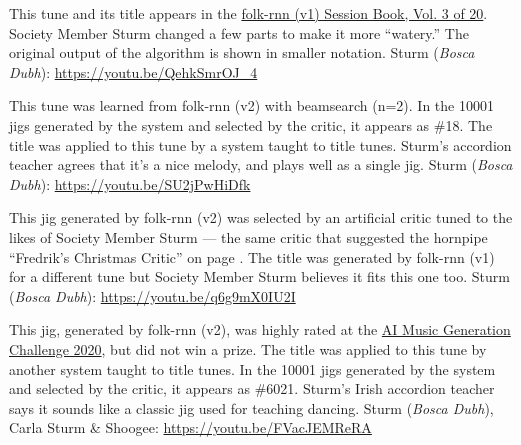 \documentclass[a4paper,notitlepage,twoside]{book}
\begin{document}
{}  
  
\hypertarget{jig:WatersofHeanny}{}
This tune and its title appears in the \href{https://highnoongmt.wordpress.com/2018/01/05/volumes-1-20-of-folk-rnn-v1-transcriptions}{folk-rnn (v1) Session Book, Vol. 3 of 20}.
Society Member Sturm changed a few parts to make it more ``watery.''
The original output of the algorithm is shown in smaller notation.
Sturm ({\em Bosca Dubh}): \url{https://youtu.be/QehkSmrOJ_4}

{}  
  
\hypertarget{jig:MyOve}{}
This tune was learned from folk-rnn (v2) with beamsearch (n=2).
In the 10001 jigs generated by the system and selected by the critic,
it appears as \#18. 
The title was applied to this tune by a system taught to title tunes.
Sturm's accordion teacher agrees that it's a nice melody,
and plays well as a single jig.
Sturm ({\em Bosca Dubh}): \url{https://youtu.be/SU2jPwHiDfk}

{}  
 
\hypertarget{jig:TeelinBrood}{}
This jig generated by folk-rnn (v2) was selected by an artificial critic 
tuned to the likes of Society Member Sturm --- the same critic that suggested
the hornpipe ``Fredrik's Christmas Critic'' on page \pageref{hornpipe:FredriksChristmasCritic}.
The title was generated by folk-rnn (v1) for a different tune
but Society Member Sturm believes it fits this one too.
Sturm ({\em Bosca Dubh}): \url{https://youtu.be/q6g9mX0IU2I}

{}  
  
\hypertarget{jig:Happytojeer}{}
This jig, generated by folk-rnn (v2),
was highly rated at the \href{https://highnoongmt.wordpress.com/2020/11/20/the-ai-music-generation-challenge-2020-summary-and-results/}{AI Music Generation Challenge 2020},
but did not win a prize. 
The title was applied to this tune by another system taught to title tunes.
In the 10001 jigs generated by the system and selected by the critic,
it appears as \#6021.
Sturm's Irish accordion teacher says it sounds like a classic jig 
used for teaching dancing.
Sturm ({\em Bosca Dubh}), Carla Sturm \& Shoogee: \url{https://youtu.be/FVacJEMReRA}
\end{document}

